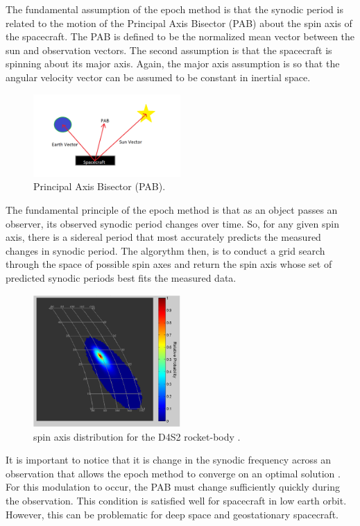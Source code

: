 \documentclass{article}
\begin{document}
The fundamental assumption of the epoch method is that the synodic period is related to the motion of the Principal Axis Bisector (PAB) about the spin axis of the spacecraft. The PAB is defined to be the normalized mean vector between the sun and observation vectors. The second assumption is that the spacecraft is spinning about its major axis. Again, the major axis assumption is so that the angular velocity vector can be assumed to be constant in inertial space.

\begin{figure}[h]
	\centering
	\includegraphics[width=0.5\textwidth]{PAB}
	\caption{Principal Axis Bisector (PAB).}
\end{figure}

The fundamental principle of the epoch method is that as an object passes an observer, its observed synodic period changes over time. So, for any given spin axis, there is a sidereal period that most accurately predicts the measured changes in synodic period. The algorythm then, is to conduct a grid search through the space of possible spin axes and return the spin axis whose set of predicted synodic periods best fits the measured data.

\begin{figure}[h]
	\centering
	\includegraphics[width=0.5\textwidth]{spin_axis_OPTICAL_CHARACTERIZATION}
	\caption{spin axis distribution for the D4S2 rocket-body \cite{Hall2014OpticalCO}.}
\end{figure}

It is important to notice that it is change in the synodic frequency across an observation that allows the epoch method to converge on an optimal solution \cite{Wallace}. For this modulation to occur, the PAB must change sufficiently quickly during the observation. This condition is satisfied well for spacecraft in low earth orbit. However, this can be problematic for deep space and geostationary spacecraft.
\end{document}
